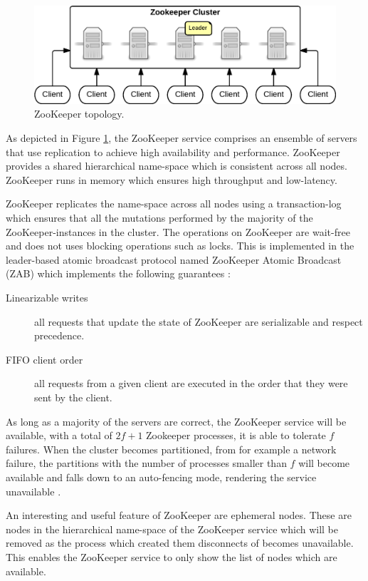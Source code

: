 \begin{figure}[ht!]
\centering
\includegraphics[width=.9\textwidth]{figures/zookeeper.png}
\caption{ZooKeeper topology. \label{fig:ZooKeeper}}
\end{figure}

As depicted in Figure \ref{fig:ZooKeeper}, the ZooKeeper service comprises an ensemble of servers that use replication to achieve high availability and performance. ZooKeeper provides a shared hierarchical name-space which is consistent across all nodes. ZooKeeper runs in memory which ensures high throughput and low-latency.

ZooKeeper replicates the name-space across all nodes using a transaction-log which ensures that all the mutations performed by the majority of the ZooKeeper-instances in the cluster. The operations on ZooKeeper are wait-free and does not uses blocking operations such as locks. This is implemented in the leader-based atomic broadcast
protocol named ZooKeeper Atomic Broadcast (ZAB) \cite{zab} which implements the following guarantees \cite{Hunt:2010}:

\begin{description} 
    \item[Linearizable writes] all requests that update the state of ZooKeeper are serializable and respect precedence.
    \item[FIFO client order] all requests from a given client are executed in the order that they were sent by the client.
\end{description}

As long as a majority of the servers are correct, the ZooKeeper service will be available, with a total of $2f+1$ Zookeeper processes, it is able to tolerate $f$ failures. When the cluster becomes partitioned, from for example a network failure, the partitions with the number of processes smaller than $f$ will become available and falls down to an auto-fencing mode, rendering the service unavailable \cite{0201619180}.

An interesting and useful feature of ZooKeeper are ephemeral nodes. These are nodes in the hierarchical name-space of the ZooKeeper service which will be removed as the process which created them disconnects of becomes unavailable. This enables the ZooKeeper service to only show the list of nodes which are available.

